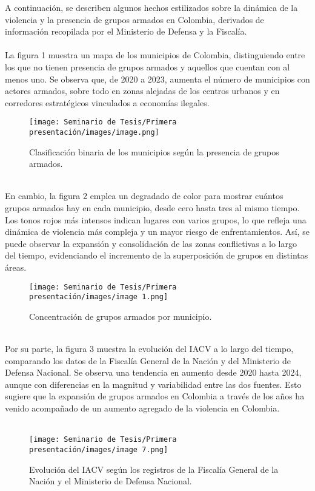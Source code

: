 
A continuación, se describen algunos hechos estilizados sobre la dinámica de la violencia y la presencia de grupos armados en Colombia, derivados de información recopilada por el Ministerio de Defensa y la Fiscalía.
\\\\
La figura 1 muestra un mapa de los municipios de Colombia, distinguiendo entre los que no tienen presencia de grupos armados y aquellos que cuentan con al menos uno. Se observa que, de 2020 a 2023, aumenta el número de municipios con actores armados, sobre todo en zonas alejadas de los centros urbanos y en corredores estratégicos vinculados a economías ilegales.

\begin{figure}[h]
    \centering
    \texttt{[image: Seminario de Tesis/Primera presentación/images/image.png]}
    \caption{Clasificación binaria de los municipios según la presencia de grupos armados.}
    \label{fig:graph1}
\end{figure}
\\
En cambio, la figura 2 emplea un degradado de color para mostrar cuántos grupos armados hay en cada municipio, desde cero hasta tres al mismo tiempo. Los tonos rojos más intensos indican lugares con varios grupos, lo que refleja una dinámica de violencia más compleja y un mayor riesgo de enfrentamientos. Así, se puede observar la expansión y consolidación de las zonas conflictivas a lo largo del tiempo, evidenciando el incremento de la superposición de grupos en distintas áreas.

\begin{figure}[h]
    \centering
    \texttt{[image: Seminario de Tesis/Primera presentación/images/image 1.png]}
    \caption{Concentración de grupos armados por municipio.}
    \label{fig:graph2}
\end{figure}
\\
Por su parte, la figura 3 muestra la evolución del IACV a lo largo del tiempo, comparando los datos de la Fiscalía General de la Nación y del Ministerio de Defensa Nacional. Se observa una tendencia en aumento desde 2020 hasta 2024, aunque con diferencias en la magnitud y variabilidad entre las dos fuentes. Esto sugiere que la expansión de grupos armados en Colombia a través de los años ha venido acompañado de un aumento agregado de la violencia en Colombia.
\\\\
\begin{figure}[h]
    \centering
    \texttt{[image: Seminario de Tesis/Primera presentación/images/image 7.png]}
    \caption{Evolución del IACV según los registros de la Fiscalía General de la Nación y el Ministerio de Defensa Nacional.}
    \label{fig:graph3}
\end{figure}


